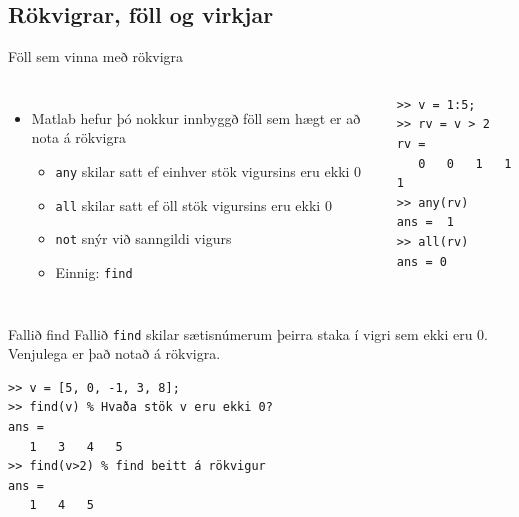 \documentclass[handout]{beamer}
\begin{document}
\subsection{Rökvigrar, föll og virkjar}
\begin{frame}[fragile]{Föll sem vinna með rökvigra}
\begin{columns}
\begin{itemize}
 \item Matlab hefur þó nokkur innbyggð föll sem hægt er að nota á rökvigra
 \begin{itemize}
  \item \texttt{any} skilar satt ef einhver stök vigursins eru ekki $0$
  \item \texttt{all} skilar satt ef öll stök vigursins eru ekki $0$
  \item \texttt{not} snýr við sanngildi vigurs
  \item Einnig: \texttt{find}
 \end{itemize}
\end{itemize}
\begin{verbatim}
>> v = 1:5;
>> rv = v > 2
rv =
   0   0   1   1   1
>> any(rv)
ans =  1
>> all(rv)
ans = 0
\end{verbatim}
\end{columns}
\end{frame}

\begin{frame}[fragile]{Fallið find}
Fallið \texttt{find} skilar sætisnúmerum þeirra staka í vigri sem ekki eru 0. Venjulega er það notað á rökvigra.
\begin{verbatim}
>> v = [5, 0, -1, 3, 8];
>> find(v) % Hvaða stök v eru ekki 0?
ans =
   1   3   4   5
>> find(v>2) % find beitt á rökvigur
ans =
   1   4   5
\end{verbatim}
\end{frame}
\end{document}
